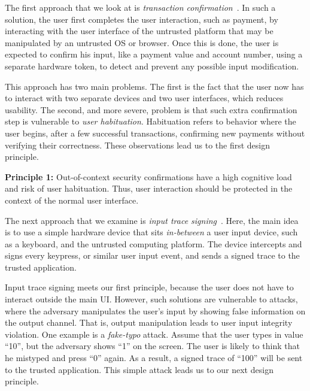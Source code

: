 The first approach that we look at is \emph{transaction confirmation}~\cite{filyanov2011uni}. In such a solution, the user first completes the user interaction, such as payment, by interacting with the user interface of the untrusted platform that may be manipulated by an untrusted OS or browser. Once this is done, the user is expected to confirm his input, like a payment value and account number, using a separate hardware token, to detect and prevent any possible input modification.

This approach has two main problems. The first is the fact that the user now has to interact with two separate devices and two user interfaces, which reduces usability. The second, and more severe, problem is that such extra confirmation step is vulnerable to \emph{user habituation}. Habituation refers to behavior where the user begins, after a few successful transactions, confirming new payments without verifying their correctness. These observations lead us to the first design principle.  

\begin{tcolorbox}
\textbf{Principle 1:} Out-of-context security confirmations have a high cognitive load and risk of user habituation. Thus, user interaction should be protected in the context of the normal user interface.
\end{tcolorbox}

The next approach that we examine is \emph{input trace signing}~\cite{IntegriKey}. Here, the main idea is to use a simple hardware device that sits \emph{in-between} a user input device, such as a keyboard, and the untrusted computing platform. The device intercepts and signs every keypress, or similar user input event, and sends a signed trace to the trusted application. %

Input trace signing meets our first principle, because the user does not have to interact outside the main UI. However, such solutions are vulnerable to attacks, where the adversary manipulates the user's input by showing false information on the output channel. That is, output manipulation leads to user input integrity violation. One example is a \emph{fake-typo} attack. Assume that the user types in value ``10'', but the adversary shows ``1'' on the screen. The user is likely to think that he mistyped and press ``0'' again. As a result, a signed trace of ``100'' will be sent to the trusted application. This simple attack leads us to our next design principle.

